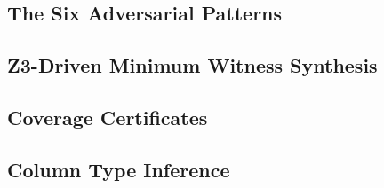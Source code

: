 \documentclass[12pt,a4paper]{report}
\begin{document}
  \subsection{The Six Adversarial Patterns}
  \label{subsec:cdais-patterns}

  \subsection{Z3-Driven Minimum Witness Synthesis}
  \label{subsec:cdais-z3}

  \subsection{Coverage Certificates}
  \label{subsec:cdais-certificates}

  \subsection{Column Type Inference}
  \label{subsec:cdais-type-inference}
\end{document}
